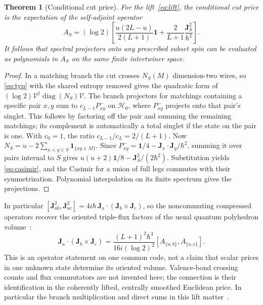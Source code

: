 \documentclass[11pt]{article}
\newtheorem{theorem}{Theorem}[section]
\theoremstyle{remark}
\newcommand{\id}{\mathbf{1}}
\newcommand{\HH}{\mathcal H}
\newcommand{\J}{\mathbf J}
\begin{document}
\begin{theorem}[Conditional cut price]\label{thm:casimir}
For the lift~\eqref{eq:lift}, the conditional cut price is the expectation of the self-adjoint operator
\begin{equation}\label{eq:casimir}
 A_S=(\log 2)\left[
 \frac{u(2L-u)}{2(L+1)}\id+
 \frac{2}{L+1}\frac{\J_S^2}{\hbar^2}\right].
\end{equation}
It follows that spectral projectors onto any prescribed subset spin can be evaluated as polynomials in \(A_S\) on the same finite intertwiner space.
\end{theorem}

\begin{proof}
In a matching branch the cut crosses \(N_S(M)\) dimension-two wires, so \eqref{eq:typ} with the shared entropy removed gives the quadratic form of \((\log2)\mathcal V^\dagger\operatorname{diag}(N_S)\mathcal V\). The branch projectors for matchings containing a specific pair \(x,y\) sum to \(c_{L-1}P^-_{xy}\) on \(\HH_0\), where \(P^-_{xy}\) projects onto that pair's singlet. This follows by factoring off the pair and summing the remaining matchings; its complement is automatically a total singlet if the state on the pair is one. With \(c_0=1\), the ratio \(c_{L-1}/c_L=2/(L+1)\). Now \(N_S=u-2\sum_{x<y\in S}\id_{\{xy\in M\}}\). Since \(P^-_{xy}=\id/4-\J_x\cdot\J_y/\hbar^2\), summing it over pairs internal to \(S\) gives \(u(u+2)\id/8-\J_S^2/(2\hbar^2)\). Substitution yields \eqref{eq:casimir}, and the Casimir for a union of full legs commutes with their symmetrization. Polynomial interpolation on its finite spectrum gives the projections.
\end{proof}

In particular \([\J_{ab}^2,\J_{ac}^2]=4i\hbar\,\J_a\cdot(\J_b\times\J_c)\), so the noncommuting compressed operators recover the oriented triple-flux factors of the usual quantum polyhedron volume~\cite{Barbieri,BianchiHaggard}:
\[
 \J_a\cdot(\J_b\times\J_c)
 =\frac{(L+1)^2\hbar^3}{16i(\log2)^2}[A_{\{a,b\}},A_{\{a,c\}}].
\]
This is an operator statement on one common code, not a claim that scalar prices in one unknown state determine its oriented volume. Valence-bond crossing counts and flux commutators are not invented here; the connection is their identification in the coherently lifted, centrally smoothed Euclidean price. In particular the branch multiplication and direct sums in this lift matter~\cite{Alet}.
\end{document}
